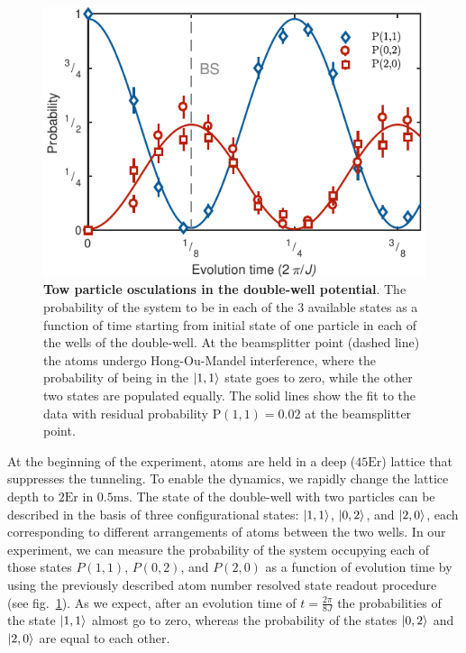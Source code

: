 \begin{figure}[t]
	\centering
	\includegraphics[scale=1]{figures/CBH_HOM.pdf}
	\caption{{\bf Tow particle osculations in the double-well potential}. The probability of the system to be in each of the $3$ available states as a function of time starting from initial state of one particle in each of the wells of the double-well. At the beamsplitter point (dashed line) the atoms undergo Hong-Ou-Mandel interference, where the probability of being in the $\left|1,1\right\rangle$ state goes to zero, while the other two states are populated equally. The solid lines show the fit to the data with residual probability $\mathrm{P}(1,1) = 0.02$ at the beamsplitter point.}
	\label{fig:CBH_HOM}
\end{figure}

At the beginning of the experiment, atoms are held in a deep ($45 \textrm{Er}$) lattice that suppresses the tunneling. To enable the dynamics, we rapidly change the lattice depth to $2\textrm{Er}$ in $0.5\textrm{ms}$. The state of the double-well with two particles can be described in the basis of three configurational states: $\left|1,1\right\rangle$, $\left|0,2\right\rangle$, and $\left|2,0\right\rangle$, each corresponding to different arrangements of atoms between the two wells. In our experiment, we can measure the probability of the system occupying each of those states $P(1,1)$, $P(0,2)$, and $P(2,0)$ as a function of evolution time by using the previously described atom number resolved state readout procedure (see fig.~\ref{fig:CBH_HOM}). As we expect, after an evolution time of $t= \frac{2 \pi}{8J}$ the probabilities of the state $\left|1,1\right\rangle$ almost go to zero, whereas the probability of the states $\left|0,2\right\rangle$ and $\left|2,0\right\rangle$ are equal to each other. 

